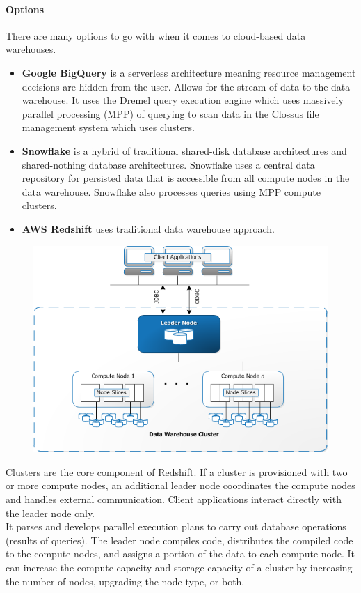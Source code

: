 \documentclass[10pt]{article}
\begin{document}
\paragraph{Options}There are many options to go with when it comes to cloud-based data warehouses.\cite{data-warehouse-comparisons}
\begin{itemize}
	\item \textbf{Google BigQuery} is a serverless architecture meaning resource management decisions are hidden from the user. Allows for the stream of data to the data warehouse. It uses the Dremel query execution engine which uses massively parallel processing (MPP) of querying to scan data in the Clossus file management system which uses clusters.
	\item \textbf{Snowflake} is a hybrid of traditional shared-disk database architectures and shared-nothing database architectures. Snowflake uses a central data repository for persisted data that is accessible from all compute nodes in the data warehouse. Snowflake also processes queries using MPP compute clusters.
	\item \textbf{AWS Redshift}\cite{redshift-architecture} uses traditional data warehouse approach.
\end{itemize}

\begin{figure}[h!]
   	\centering
   	\includegraphics[width=0.7\linewidth]{images/Redshift-Architecture.png}	
   \end{figure}
Clusters are the core component of Redshift. If a cluster is provisioned with two or more compute nodes, an additional leader node coordinates the compute nodes and handles external communication. Client applications interact directly with the leader node only.\\
It parses and develops parallel execution plans to carry out database operations (results of queries). The leader node compiles code, distributes the compiled code to the compute nodes, and assigns a portion of the data to each compute node. It can increase the compute capacity and storage capacity of a cluster by increasing the number of nodes, upgrading the node type, or both.\\
\end{document}

